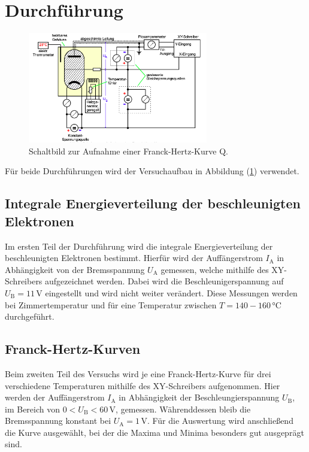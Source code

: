 \section{Durchführung}
\label{sec:Durchführung}
\begin{figure}[H]
    \centering
    \includegraphics[width=0.7\textwidth]{content/Bilder/Aufbau.png}
    \caption{Schaltbild zur Aufnahme einer Franck-Hertz-Kurve Q\cite{anleitungV601}.}
    \label{fig:Aufbau}
\end{figure}
Für beide Durchführungen wird der Versuchaufbau in Abbildung (\ref{fig:Aufbau}) verwendet.

\subsection{Integrale Energieverteilung der beschleunigten Elektronen}
Im ersten Teil der Durchführung wird die integrale Energieverteilung der beschleunigten Elektronen bestimmt. 
Hierfür wird der Auffängerstrom $I_{\text{A}}$ in Abhängigkeit von der Bremsspannung $U_{\text{A}}$ gemessen, welche 
mithilfe des XY-Schreibers aufgezeichnet werden. 
Dabei wird die Beschleunigerspannung auf $U_{\text{B}} = 11\,\unit{\volt}$ eingestellt und wird nicht weiter verändert. 
Diese Messungen werden bei Zimmertemperatur und für eine Temperatur zwischen $T = 140-160\,\unit{\celsius}$ durchgeführt.

\subsection{Franck-Hertz-Kurven}
Beim zweiten Teil des Versuchs wird je eine Franck-Hertz-Kurve für drei verschiedene Temperaturen mithilfe des XY-Schreibers aufgenommen. 
Hier werden der Auffängerstrom $I_{\text{A}}$ in Abhängigkeit der Beschleungierspannung $U_{\text{B}}$, im Bereich von 
$0 < U_{\text{B}} < 60\,\unit{\volt}$, gemessen. Währenddessen bleib die Bremsspannung konstant bei $U_{\text{A}}= 1\,\unit{\volt}$.
Für die Auswertung wird anschließend die Kurve ausgewählt, bei der die Maxima und Minima besonders gut ausgeprägt sind. 
